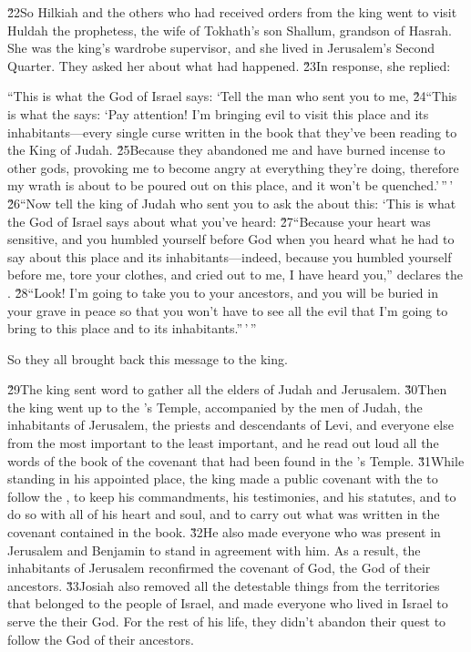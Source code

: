 \v{22}So Hilkiah and the others who had received orders from the king went to visit Huldah the prophetess, the wife of Tokhath's son Shallum, grandson of Hasrah. She was the king's wardrobe supervisor, and she lived in Jerusalem's Second Quarter. They asked her about what had happened. \v{23}In response, she replied:

\begin{poetry}
\poeml ``This is what the  God of Israel says: `Tell the man who sent you to me, \v{24}``This is what the  says: `Pay attention! I'm bringing evil to visit this place and its inhabitants---every single curse written in the book that they've been reading to the King of Judah. \v{25}Because they abandoned me and have burned incense to other gods, provoking me to become angry at everything they're doing, therefore my wrath is about to be poured out on this place, and it won't be quenched.'\,''\,' \\
\poeml \v{26}``Now tell the king of Judah who sent you to ask the  about this: `This is what the  God of Israel says about what you've heard: \v{27}``Because your heart was sensitive, and you humbled yourself before God when you heard what he had to say about this place and its inhabitants---indeed, because you humbled yourself before me, tore your clothes, and cried out to me, I have heard you,'' declares the . \v{28}``Look! I'm going to take you to your ancestors, and you will be buried in your grave in peace so that you won't have to see all the evil that I'm going to bring to this place and to its inhabitants.''\,'\,''
\end{poetry}

So they all brought back this message to the king.

\v{29}The king sent word to gather all the elders of Judah and Jerusalem. \v{30}Then the king went up to the 's Temple, accompanied by the men of Judah, the inhabitants of Jerusalem, the priests and descendants of Levi, and everyone else from the most important to the least important, and he read out loud all the words of the book of the covenant that had been found in the 's Temple. \v{31}While standing in his appointed place, the king made a public covenant with the  to follow the , to keep his commandments, his testimonies, and his statutes, and to do so with all of his heart and soul, and to carry out what was written in the covenant contained in the book. \v{32}He also made everyone who was present in Jerusalem and Benjamin to stand in agreement with him. As a result, the inhabitants of Jerusalem reconfirmed the covenant of God, the God of their ancestors. \v{33}Josiah also removed all the detestable things from the territories that belonged to the people of Israel, and made everyone who lived in Israel to serve the  their God. For the rest of his life, they didn't abandon their quest to follow the  God of their ancestors.

